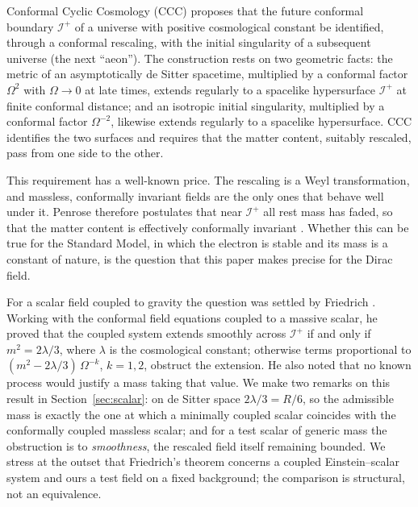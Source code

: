 \documentclass[11pt,a4paper]{article}
\theoremstyle{definition}
\newcommand{\scri}{\mathscr{I}^{+}}
\begin{document}
Conformal Cyclic Cosmology (CCC) \cite{Penrose2010,Tod2013,MeissnerPenrose2025} proposes that the future conformal boundary $\scri$ of a universe with positive cosmological constant be identified, through a conformal rescaling, with the initial singularity of a subsequent universe (the next ``aeon''). The construction rests on two geometric facts: the metric of an asymptotically de Sitter spacetime, multiplied by a conformal factor $\Omega^{2}$ with $\Omega\to0$ at late times, extends regularly to a spacelike hypersurface $\scri$ at finite conformal distance; and an isotropic initial singularity, multiplied by a conformal factor $\Omega^{-2}$, likewise extends regularly to a spacelike hypersurface. CCC identifies the two surfaces and requires that the matter content, suitably rescaled, pass from one side to the other.

This requirement has a well-known price. The rescaling is a Weyl transformation, and massless, conformally invariant fields are the only ones that behave well under it. Penrose therefore postulates that near $\scri$ all rest mass has faded, so that the matter content is effectively conformally invariant \cite{Penrose2010}. Whether this can be true for the Standard Model, in which the electron is stable and its mass is a constant of nature, is the question that this paper makes precise for the Dirac field.

For a scalar field coupled to gravity the question was settled by Friedrich \cite{Friedrich2014}. Working with the conformal field equations coupled to a massive scalar, he proved that the coupled system extends smoothly across $\scri$ if and only if $m^{2}=2\lambda/3$, where $\lambda$ is the cosmological constant; otherwise terms proportional to $(m^{2}-2\lambda/3)\,\Omega^{-k}$, $k=1,2$, obstruct the extension. He also noted that no known process would justify a mass taking that value. We make two remarks on this result in Section~\ref{sec:scalar}: on de Sitter space $2\lambda/3=R/6$, so the admissible mass is exactly the one at which a minimally coupled scalar coincides with the conformally coupled massless scalar; and for a test scalar of generic mass the obstruction is to \emph{smoothness}, the rescaled field itself remaining bounded. We stress at the outset that Friedrich's theorem concerns a coupled Einstein--scalar system and ours a test field on a fixed background; the comparison is structural, not an equivalence.
\end{document}
